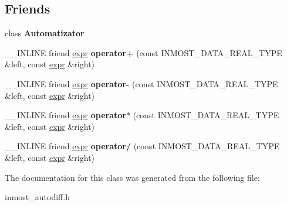 \subsection*{Friends}
\begin{DoxyCompactItemize}
\item 
\hypertarget{classINMOST_1_1expr_a5e6551936548e76585193e587e1eee25}{class {\bfseries Automatizator}}\label{classINMOST_1_1expr_a5e6551936548e76585193e587e1eee25}

\item 
\hypertarget{classINMOST_1_1expr_a72d23c96a8a87dedff7b8903ed0da99a}{\-\_\-\-\_\-\-I\-N\-L\-I\-N\-E friend \hyperlink{classINMOST_1_1expr}{expr} {\bfseries operator+} (const I\-N\-M\-O\-S\-T\-\_\-\-D\-A\-T\-A\-\_\-\-R\-E\-A\-L\-\_\-\-T\-Y\-P\-E \&left, const \hyperlink{classINMOST_1_1expr}{expr} \&right)}\label{classINMOST_1_1expr_a72d23c96a8a87dedff7b8903ed0da99a}

\item 
\hypertarget{classINMOST_1_1expr_a6ad9c034b3dd86b111696da55b64bb34}{\-\_\-\-\_\-\-I\-N\-L\-I\-N\-E friend \hyperlink{classINMOST_1_1expr}{expr} {\bfseries operator-\/} (const I\-N\-M\-O\-S\-T\-\_\-\-D\-A\-T\-A\-\_\-\-R\-E\-A\-L\-\_\-\-T\-Y\-P\-E \&left, const \hyperlink{classINMOST_1_1expr}{expr} \&right)}\label{classINMOST_1_1expr_a6ad9c034b3dd86b111696da55b64bb34}

\item 
\hypertarget{classINMOST_1_1expr_a6320d5cd1717f8b8ecf617b1b6381d12}{\-\_\-\-\_\-\-I\-N\-L\-I\-N\-E friend \hyperlink{classINMOST_1_1expr}{expr} {\bfseries operator$\ast$} (const I\-N\-M\-O\-S\-T\-\_\-\-D\-A\-T\-A\-\_\-\-R\-E\-A\-L\-\_\-\-T\-Y\-P\-E \&left, const \hyperlink{classINMOST_1_1expr}{expr} \&right)}\label{classINMOST_1_1expr_a6320d5cd1717f8b8ecf617b1b6381d12}

\item 
\hypertarget{classINMOST_1_1expr_aba15bcaf69052c3eab88432a8232b0c3}{\-\_\-\-\_\-\-I\-N\-L\-I\-N\-E friend \hyperlink{classINMOST_1_1expr}{expr} {\bfseries operator/} (const I\-N\-M\-O\-S\-T\-\_\-\-D\-A\-T\-A\-\_\-\-R\-E\-A\-L\-\_\-\-T\-Y\-P\-E \&left, const \hyperlink{classINMOST_1_1expr}{expr} \&right)}\label{classINMOST_1_1expr_aba15bcaf69052c3eab88432a8232b0c3}

\end{DoxyCompactItemize}


The documentation for this class was generated from the following file\-:\begin{DoxyCompactItemize}
\item 
inmost\-\_\-autodiff.\-h\end{DoxyCompactItemize}

